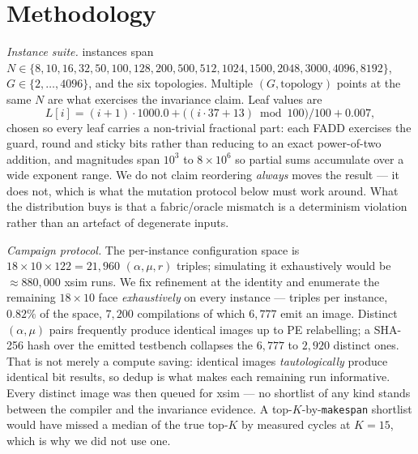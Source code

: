 \documentclass[journal,10pt]{IEEEtran}
\theoremstyle{plain}
\theoremstyle{definition}
\theoremstyle{remark}
\newcommand{\sv}[1]{\texttt{#1}}
\newcommand{\asgn}{\ensuremath{\alpha}}
\newcommand{\map}{\ensuremath{\mu}}
\begin{document}
\section{Methodology}\label{sec:method}

\emph{Instance suite.} \SuiteSize{} instances span $N \in \{8, 10, 16, 32,
50, 100, 128, 200, 500, 512, 1024, 1500, 2048, 3000, 4096, 8192\}$,
$G \in \{2,\ldots,4096\}$, and the six topologies. Multiple
$(G,\text{topology})$ points at the same $N$ are what exercises the invariance
claim. Leaf values are
\begin{equation}\label{eq:leaves}
L[i] = (i+1)\cdot 1000.0 + \bigl((i \cdot 37 + 13) \bmod 100\bigr)/100 + 0.007,
\end{equation}
chosen so every leaf carries a non-trivial fractional part: each FADD
exercises the guard, round and sticky bits rather than reducing to an exact
power-of-two addition, and magnitudes span $10^3$ to $8\times10^6$ so partial
sums accumulate over a wide exponent range. We do not claim reordering
\emph{always} moves the result --- it does not, which is what the mutation
protocol below must work around. What the distribution buys is that a
fabric/oracle mismatch is a determinism violation rather than an artefact of
degenerate inputs.

\emph{Campaign protocol.} The per-instance configuration space is
$18\times10\times122 = 21{,}960$ $(\asgn,\map,r)$ triples; simulating it
exhaustively would be ${\approx}880{,}000$ xsim runs. We fix refinement at the
identity and enumerate the remaining $18\times10$ face \emph{exhaustively} on
every instance --- \SelConfigsTotal{} triples per instance, $0.82\%$ of the
space, $7{,}200$ compilations of which $6{,}777$ emit an image. Distinct
$(\asgn,\map)$ pairs frequently produce identical images up to PE relabelling;
a SHA-256 hash over the emitted testbench collapses the $6{,}777$ to $2{,}920$
distinct ones. That is not merely a compute saving: identical images
\emph{tautologically} produce identical bit results, so dedup is what makes
each remaining run informative. Every distinct image was then queued for xsim
--- no shortlist of any kind stands between the compiler and the invariance
evidence. A top-$K$-by-\sv{makespan} shortlist would have missed a median
\TournLeakPctFifteen{} of the true top-$K$ by measured cycles at $K = 15$,
which is why we did not use one.
\end{document}
